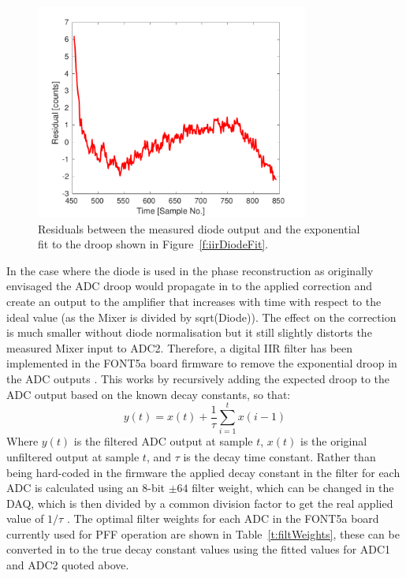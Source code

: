 \begin{figure}
  \centering
  \includegraphics[width=0.8\textwidth]{Figures/commissioning/iirDiodeFitResid}
  \caption{Residuals between the measured diode output and the exponential fit to the droop shown in Figure~\ref{f:iirDiodeFit}.}
  \label{f:iirDiodeFitResid}
\end{figure}

In the case where the diode is used in the phase reconstruction as originally envisaged the ADC droop would propagate in to the applied correction and create an output to the amplifier that increases with time with respect to the ideal value (as the Mixer is divided by sqrt(Diode)). The effect on the correction is much smaller without diode normalisation but it still slightly distorts the measured Mixer input to ADC2. Therefore, a digital IIR filter has been implemented in the FONT5a board firmware to remove the exponential droop in the ADC outputs \cite{glennCLIC14}. This works by recursively adding the expected droop to the ADC output based on the known decay constants, so that:
\begin{equation}
y(t) = x(t) + \frac{1}{\tau} \sum_{i=1}^{t} x(i-1)
\end{equation}
\label{e:iirFilt}
Where \(y(t)\) is the filtered ADC output at sample \(t\), \(x(t)\) is the original unfiltered output at sample \(t\), and \(\tau\) is the decay time constant. Rather than being hard-coded in the firmware the applied decay constant in the filter for each ADC is calculated using an 8-bit \(\pm64\) filter weight, which can be changed in the DAQ, which is then divided by a common division factor to get the real applied value of \(1/\tau\) \cite{glennPriv}. The optimal filter weights for each ADC in the FONT5a board currently used for PFF operation are shown in Table~\ref{t:filtWeights}, these can be converted in to the true decay constant values using the fitted values for ADC1 and ADC2 quoted above.

